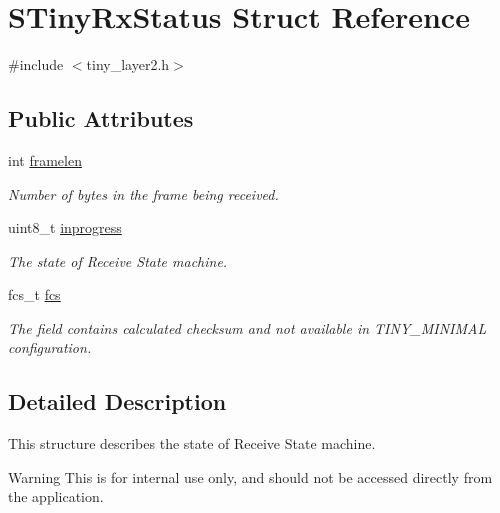 \hypertarget{structSTinyRxStatus}{}\section{S\+Tiny\+Rx\+Status Struct Reference}
\label{structSTinyRxStatus}


{\ttfamily \#include $<$tiny\+\_\+layer2.\+h$>$}

\subsection*{Public Attributes}
\begin{DoxyCompactItemize}
\item 
int \hyperlink{structSTinyRxStatus_ad9f6055b8e74f10894c48ff2247f51c4}{framelen}
\begin{DoxyCompactList}\small\item\em Number of bytes in the frame being received. \end{DoxyCompactList}\item 
\hypertarget{structSTinyRxStatus_aaa956a3e43e12753ef43b76bb51d298e}{}uint8\+\_\+t \hyperlink{structSTinyRxStatus_aaa956a3e43e12753ef43b76bb51d298e}{inprogress}\label{structSTinyRxStatus_aaa956a3e43e12753ef43b76bb51d298e}

\begin{DoxyCompactList}\small\item\em The state of Receive State machine. \end{DoxyCompactList}\item 
\hypertarget{structSTinyRxStatus_a609d1743d90eff27819207961850ee48}{}fcs\+\_\+t \hyperlink{structSTinyRxStatus_a609d1743d90eff27819207961850ee48}{fcs}\label{structSTinyRxStatus_a609d1743d90eff27819207961850ee48}

\begin{DoxyCompactList}\small\item\em The field contains calculated checksum and not available in T\+I\+N\+Y\+\_\+\+M\+I\+N\+I\+M\+A\+L configuration. \end{DoxyCompactList}\end{DoxyCompactItemize}


\subsection{Detailed Description}
This structure describes the state of Receive State machine. \begin{DoxyWarning}{Warning}
This is for internal use only, and should not be accessed directly from the application. 
\end{DoxyWarning}


